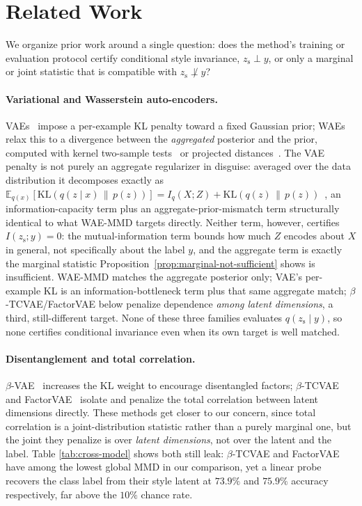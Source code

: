 \documentclass[10pt,letterpaper]{article}
\newcommand{\zs}{z_{\mathrm{s}}}
\newcommand{\KL}{\mathrm{KL}}
\begin{document}
\section{Related Work}

We organize prior work around a single question: does the method's training
or evaluation protocol certify conditional style invariance, $\zs\perp y$,
or only a marginal or joint statistic that is compatible with $\zs\not\perp
y$?

\paragraph{Variational and Wasserstein auto-encoders.}
VAEs~\citep{kingma2013autoencoding} impose a per-example KL penalty toward a
fixed Gaussian prior; WAEs~\citep{tolstikhin2017wasserstein} relax this to a
divergence between the \emph{aggregated} posterior and the prior, computed
with kernel two-sample tests~\citep{gretton2012kernel} or projected
distances~\citep{kolouri2018sliced}. The VAE penalty is not purely an
aggregate regularizer in disguise: averaged over the data distribution it
decomposes exactly as
$\mathbb E_{q(x)}[\KL(q(z\mid x)\,\|\,p(z))] = I_q(X;Z) +
\KL(q(z)\,\|\,p(z))$~\citep{hoffman2016elbo}, an information-capacity term
plus an aggregate-prior-mismatch term structurally identical to what
WAE-MMD targets directly. Neither term, however, certifies $I(\zs;y)=0$:
the mutual-information term bounds how much $Z$ encodes about $X$ in
general, not specifically about the label $y$, and the aggregate term is
exactly the marginal statistic Proposition~\ref{prop:marginal-not-sufficient}
shows is insufficient. WAE-MMD matches the aggregate posterior only; VAE's
per-example KL is an information-bottleneck term plus that same aggregate
match; $\beta$-TCVAE/FactorVAE below penalize dependence \emph{among latent
dimensions}, a third, still-different target. None of these three families
evaluates $q(\zs\mid y)$, so none certifies conditional invariance even
when its own target is well matched.

\paragraph{Disentanglement and total correlation.}
$\beta$-VAE~\citep{higgins2017beta} increases the KL weight to encourage
disentangled factors; $\beta$-TCVAE~\citep{chen2018isolating} and
FactorVAE~\citep{kim2018disentangling} isolate and penalize the total
correlation between latent dimensions directly. These methods get closer to
our concern, since total correlation is a joint-distribution statistic
rather than a purely marginal one, but the joint they penalize is over
\emph{latent dimensions}, not over the latent and the label. Table
\ref{tab:cross-model} shows both still leak: $\beta$-TCVAE and FactorVAE
have among the lowest global MMD in our comparison, yet a linear probe
recovers the class label from their style latent at $73.9\%$ and $75.9\%$
accuracy respectively, far above the $10\%$ chance rate.
\end{document}

